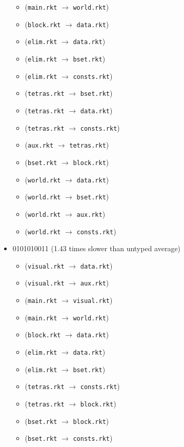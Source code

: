 \documentclass{article}
\newcommand{\mono}[1]{\texttt{#1}}
\begin{document}
\begin{itemize}
\begin{itemize}
  \item (\mono{main.rkt} $\rightarrow$ \mono{world.rkt})
  \item (\mono{block.rkt} $\rightarrow$ \mono{data.rkt})
  \item (\mono{elim.rkt} $\rightarrow$ \mono{data.rkt})
  \item (\mono{elim.rkt} $\rightarrow$ \mono{bset.rkt})
  \item (\mono{elim.rkt} $\rightarrow$ \mono{consts.rkt})
  \item (\mono{tetras.rkt} $\rightarrow$ \mono{bset.rkt})
  \item (\mono{tetras.rkt} $\rightarrow$ \mono{data.rkt})
  \item (\mono{tetras.rkt} $\rightarrow$ \mono{consts.rkt})
  \item (\mono{aux.rkt} $\rightarrow$ \mono{tetras.rkt})
  \item (\mono{bset.rkt} $\rightarrow$ \mono{block.rkt})
  \item (\mono{world.rkt} $\rightarrow$ \mono{data.rkt})
  \item (\mono{world.rkt} $\rightarrow$ \mono{bset.rkt})
  \item (\mono{world.rkt} $\rightarrow$ \mono{aux.rkt})
  \item (\mono{world.rkt} $\rightarrow$ \mono{consts.rkt})
  \end{itemize}
\item 0101010011 (1.43 times slower than untyped average)
  \begin{itemize}
  \item (\mono{visual.rkt} $\rightarrow$ \mono{data.rkt})
  \item (\mono{visual.rkt} $\rightarrow$ \mono{aux.rkt})
  \item (\mono{main.rkt} $\rightarrow$ \mono{visual.rkt})
  \item (\mono{main.rkt} $\rightarrow$ \mono{world.rkt})
  \item (\mono{block.rkt} $\rightarrow$ \mono{data.rkt})
  \item (\mono{elim.rkt} $\rightarrow$ \mono{data.rkt})
  \item (\mono{elim.rkt} $\rightarrow$ \mono{bset.rkt})
  \item (\mono{tetras.rkt} $\rightarrow$ \mono{consts.rkt})
  \item (\mono{tetras.rkt} $\rightarrow$ \mono{block.rkt})
  \item (\mono{bset.rkt} $\rightarrow$ \mono{block.rkt})
  \item (\mono{bset.rkt} $\rightarrow$ \mono{consts.rkt})

\end{itemize}
\end{itemize}
\end{document}
